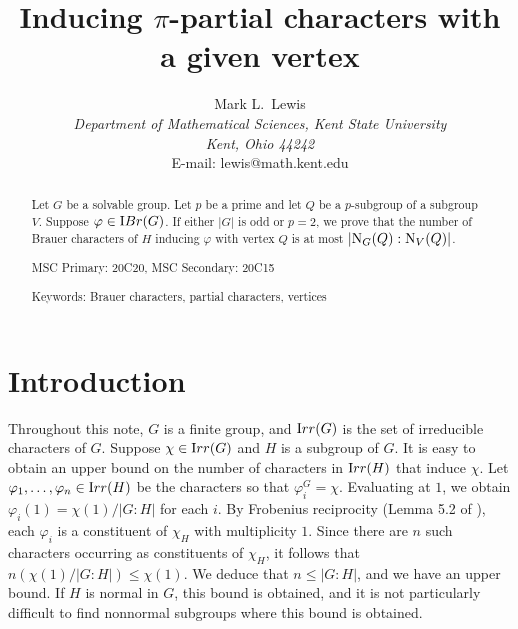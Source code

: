 \documentclass[12pt]{article}
\def\irr#1{{\textrm  Irr}(#1)}
\def\ibr#1{{\textrm IBr} (#1)}
\def\norm#1#2{{\textrm N}_{#1} (#2)}
\def\phi{\varphi}
\begin{document}
\title{Inducing $\pi$-partial characters with a given vertex}

\author {
       Mark L.\ Lewis
    \\ {\it Department of Mathematical Sciences, Kent State University}
    \\ {\it Kent, Ohio 44242}
    \\ E-mail: lewis@math.kent.edu
       }

\maketitle

\begin{abstract}
Let $G$ be a solvable group.  Let $p$ be a prime and let $Q$ be a
$p$-subgroup of a subgroup $V$.  Suppose $\phi \in \ibr G$.  If
either $|G|$ is odd or $p = 2$, we prove that the number of Brauer
characters of $H$ inducing $\phi$ with vertex $Q$ is at most $|\norm
GQ: \norm VQ|$.

MSC Primary: 20C20, MSC Secondary: 20C15

Keywords: Brauer characters, partial characters, vertices
\end{abstract}




\section{Introduction}

Throughout this note, $G$ is a finite group, and $\irr G$ is the set
of irreducible characters of $G$.  Suppose $\chi \in \irr G$ and $H$
is a subgroup of $G$.  It is easy to obtain an upper bound on the
number of characters in $\irr H$ that induce $\chi$.  Let $\phi_1,
\dots, \phi_n \in \irr H$ be the characters so that $\phi_i^G =
\chi$.  Evaluating at $1$, we obtain $\phi_i (1) = \chi (1)/|G:H|$
for each $i$.  By Frobenius reciprocity (Lemma 5.2 of \cite{text}),
each $\phi_i$ is a constituent of $\chi_H$ with multiplicity $1$.
Since there are $n$ such characters occurring as constituents of
$\chi_H$, it follows that $n (\chi (1)/|G:H|) \le \chi (1)$.  We
deduce that $n \le |G:H|$, and we have an upper bound.  If $H$ is
normal in $G$, this bound is obtained, and it is not particularly
difficult to find nonnormal subgroups where this bound is obtained.
\end{document}
